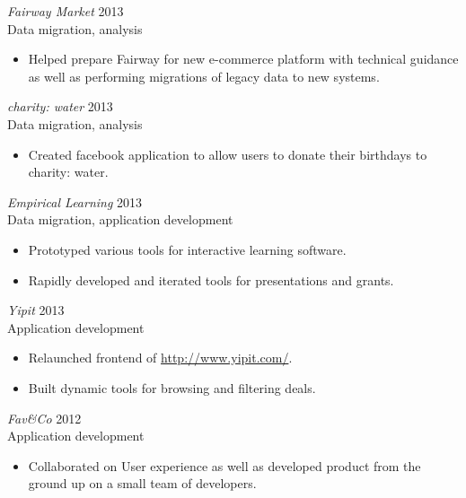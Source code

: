 \documentclass[line,margin]{res}
\begin{document}
\begin{resume}
    {\sl Fairway Market}
    \hfill 2013 \\
    Data migration, analysis
    \begin{itemize} \itemsep -2pt
        \item
            Helped prepare Fairway for new e-commerce platform with technical guidance as well as
            performing migrations of legacy data to new systems.
    \end{itemize}

    {\sl charity: water}
    \hfill 2013 \\
    Data migration, analysis
    \begin{itemize} \itemsep -2pt
        \item
            Created facebook application to allow users to donate their birthdays to charity: water.
    \end{itemize}

    \begin{samepage}
    {\sl Empirical Learning}
    \hfill 2013 \\
    Data migration, application development
    \begin{itemize} \itemsep -2pt
        \item
            Prototyped various tools for interactive learning software.
        \item
            Rapidly developed and iterated tools for presentations and grants.
    \end{itemize}
    \end{samepage}

    {\sl Yipit}
    \hfill 2013 \\
    Application development
    \begin{itemize} \itemsep -2pt
        \item
            Relaunched frontend of \url{http://www.yipit.com/}.
        \item
            Built dynamic tools for browsing and filtering deals.
    \end{itemize}

    {\sl Fav\&Co}
    \hfill 2012 \\
    Application development
    \begin{itemize} \itemsep -2pt
        \item
            Collaborated on User experience as well as developed
            product from the ground up on a small team of developers.
    \end{itemize}


\end{resume}
\end{document}
